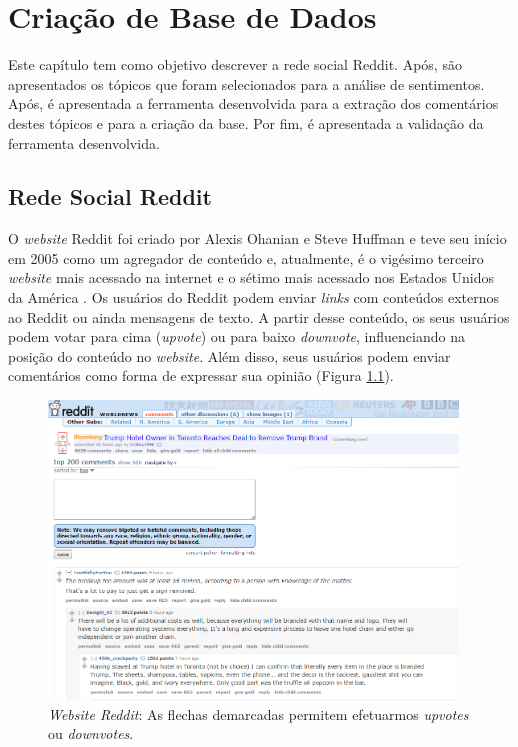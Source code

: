 \chapter{Criação de Base de Dados}
\label{cap:banco}
Este capítulo tem como objetivo descrever a rede social Reddit.
Após, são apresentados os tópicos que foram selecionados para a análise de
sentimentos. Após, é apresentada a ferramenta desenvolvida para a extração
dos comentários destes tópicos e para a criação da base. Por fim, é
apresentada a validação da ferramenta desenvolvida.
\section{Rede Social Reddit}
\label{cap:Reddit}

O \textit{website} Reddit foi criado por Alexis Ohanian e Steve Huffman e teve
seu início em 2005 como um agregador de conteúdo e, atualmente, é o vigésimo terceiro \textit{website} mais acessado na
internet e o sétimo mais acessado nos Estados Unidos da América \cite{alexa}.
Os usuários do Reddit podem enviar \textit{links} com conteúdos externos
ao Reddit ou ainda mensagens de texto. A partir desse conteúdo, os seus
usuários podem votar para cima (\textit{upvote}) ou para baixo \textit{downvote},
influenciando na posição do conteúdo no \textit{website}. Além disso, seus
usuários podem enviar comentários como forma de expressar sua opinião (Figura \ref{fig:reddit}).


\begin{figure}[!htbp]
\centering
\includegraphics[height=300px]{imagens/reddit.png}
\caption{\textit{Website Reddit}:  As flechas demarcadas permitem efetuarmos
\textit{upvotes} ou \textit{downvotes}.}
\label{fig:reddit}
\end{figure}

